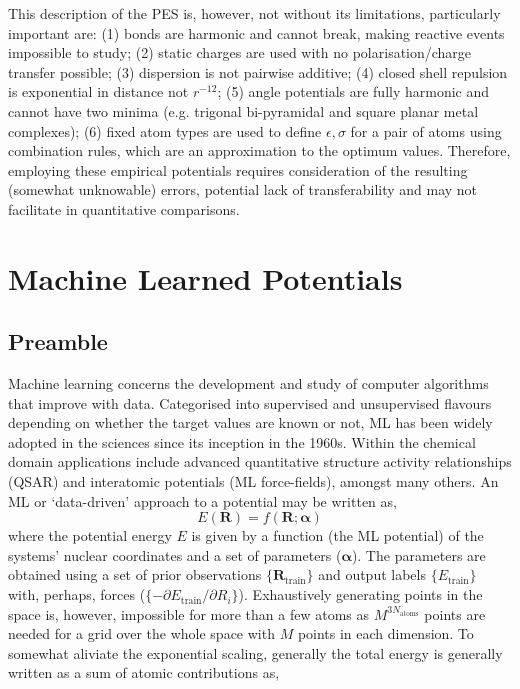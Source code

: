 \documentclass[main.tex]{subfiles}
\begin{document}
This description of the PES is, however, not without its limitations, particularly important are: (1) bonds are harmonic and cannot break, making reactive events impossible to study; (2) static charges are used with no polarisation/charge transfer possible; (3) dispersion is not pairwise additive; (4) closed shell repulsion is exponential in distance not $r^{-12}$; (5) angle potentials are fully harmonic and cannot have two minima (e.g. trigonal bi-pyramidal and square planar metal complexes); (6) fixed atom types are used to define $\epsilon, \sigma$ for a pair of atoms using combination rules, which are an approximation to the optimum values.\cite{Boda2008} Therefore, employing these empirical potentials requires consideration of the resulting (somewhat unknowable) errors, potential lack of transferability and may not facilitate in quantitative comparisons.\cite{Harrison2018, LewisAtwell2021}


\section{Machine Learned Potentials}
\subsection{Preamble}

Machine learning concerns the development and study of computer algorithms that improve with data.\cite{Mitchell1997} Categorised into supervised and unsupervised flavours depending on whether the target values are known or not, ML has been widely adopted in the sciences since its inception in  the 1960s.\cite{Carleo2019} Within the chemical domain applications include advanced quantitative structure activity relationships (QSAR) and interatomic potentials (ML force-fields), amongst many others.\cite{Cova2019} An ML or `data-driven' approach to a potential may be written as,
\begin{equation}
	E(\boldsymbol{R}) = f(\boldsymbol{R}; \boldsymbol{\alpha})
\end{equation}
where the potential energy $E$ is given by a function (the ML potential) of the systems' nuclear coordinates and a set of parameters ($\boldsymbol{\alpha}$). The parameters are obtained using a set of prior observations $\{\boldsymbol{R}_\text{train}\}$ and output labels $\{E_\text{train}\}$ with, perhaps, forces ($\{-\partial E_\text{train}/\partial R_i\}$). Exhaustively generating points in the space is, however, impossible for more than a few atoms as $M^{3N_\text{atoms}}$ points are needed for a grid over the whole space with $M$ points in each dimension. To somewhat aliviate the exponential scaling, generally the total energy is generally written as a sum of atomic contributions as,
\end{document}
